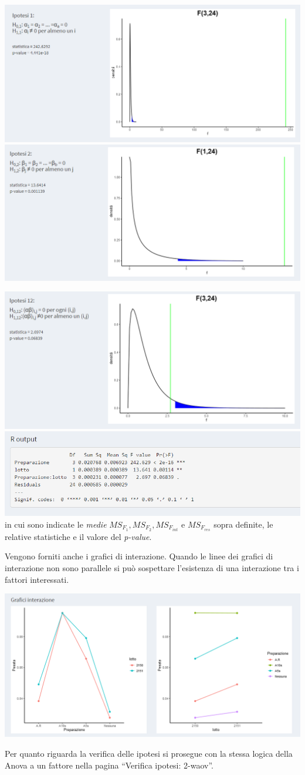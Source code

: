 \documentclass[
  11pt,
]{book}
\begin{document}
\includegraphics[width=0.5\linewidth]{Immagini/Anova/13_anova2}
\includegraphics[width=0.5\linewidth]{Immagini/Anova/14_anova2}

\includegraphics[width=0.5\linewidth]{Immagini/Anova/15_anova2}
\includegraphics[width=0.5\linewidth]{Immagini/Anova/16_Rout_anova2}
in cui sono indicate le \emph{medie} \(MS_{F_1}, MS_{F_2}, MS_{F_{int}}\) e \(MS_{F_{res}}\) sopra definite, le relative statistiche e il valore del \emph{p-value}.

Vengono forniti anche i grafici di interazione. Quando le linee dei grafici di interazione non sono parallele si può sospettare l'esistenza di una interazione tra i fattori interessati.

\begin{center}\includegraphics[width=0.5\linewidth]{Immagini/Anova/17_graf_interaz__anova2} \end{center}

Per quanto riguarda la verifica delle ipotesi si prosegue con la stessa logica della Anova a un fattore nella pagina ``Verifica ipotesi: 2-waov''.

\backmatter

  

\end{document}
